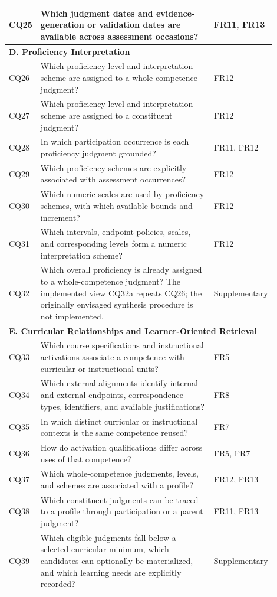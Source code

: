 \begin{longtable}{p{0.08\linewidth} p{0.70\linewidth} p{0.12\linewidth}}
CQ25 & Which judgment dates and evidence-generation or validation dates are available across assessment occasions? & FR11, FR13 \\
\midrule
\multicolumn{3}{l}{\textbf{D. Proficiency Interpretation}} \\
\midrule
CQ26 & Which proficiency level and interpretation scheme are assigned to a whole-competence judgment? & FR12 \\
CQ27 & Which proficiency level and interpretation scheme are assigned to a constituent judgment? & FR12 \\
CQ28 & In which participation occurrence is each proficiency judgment grounded? & FR11, FR12 \\
CQ29 & Which proficiency schemes are explicitly associated with assessment occurrences? & FR12 \\
CQ30 & Which numeric scales are used by proficiency schemes, with which available bounds and increment? & FR12 \\
CQ31 & Which intervals, endpoint policies, scales, and corresponding levels form a numeric interpretation scheme? & FR12 \\
CQ32 & Which overall proficiency is already assigned to a whole-competence judgment? The implemented view CQ32a repeats CQ26; the originally envisaged synthesis procedure is not implemented. & Supplementary \\
\midrule
\multicolumn{3}{l}{\textbf{E. Curricular Relationships and Learner-Oriented Retrieval}} \\
\midrule
CQ33 & Which course specifications and instructional activations associate a competence with curricular or instructional units? & FR5 \\
CQ34 & Which external alignments identify internal and external endpoints, correspondence types, identifiers, and available justifications? & FR8 \\
CQ35 & In which distinct curricular or instructional contexts is the same competence reused? & FR7 \\
CQ36 & How do activation qualifications differ across uses of that competence? & FR5, FR7 \\
CQ37 & Which whole-competence judgments, levels, and schemes are associated with a profile? & FR12, FR13 \\
CQ38 & Which constituent judgments can be traced to a profile through participation or a parent judgment? & FR11, FR13 \\
CQ39 & Which eligible judgments fall below a selected curricular minimum, which candidates can optionally be materialized, and which learning needs are explicitly recorded? & Supplementary \\

\end{longtable}
